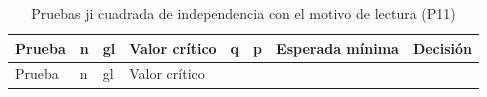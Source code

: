 \documentclass[
  spanish,
  11pt,
]{extarticle}
\begin{document}
\begin{longtable}[]{@{}
  >{\raggedright\arraybackslash}p{}
  >{\raggedleft\arraybackslash}p{}
  >{\raggedleft\arraybackslash}p{}
  >{\raggedleft\arraybackslash}p{}
  >{\raggedleft\arraybackslash}p{}
  >{\raggedright\arraybackslash}p{}
  >{\raggedleft\arraybackslash}p{}
  >{\raggedright\arraybackslash}p{}@{}}
\caption{Pruebas ji cuadrada de independencia con el motivo de lectura
(P11)}\tabularnewline
\toprule\noalign{}
\begin{minipage}[b]{\linewidth}\raggedright
Prueba
\end{minipage} & \begin{minipage}[b]{\linewidth}\raggedleft
n
\end{minipage} & \begin{minipage}[b]{\linewidth}\raggedleft
gl
\end{minipage} & \begin{minipage}[b]{\linewidth}\raggedleft
Valor crítico
\end{minipage} & \begin{minipage}[b]{\linewidth}\raggedleft
q
\end{minipage} & \begin{minipage}[b]{\linewidth}\raggedright
p
\end{minipage} & \begin{minipage}[b]{\linewidth}\raggedleft
Esperada mínima
\end{minipage} & \begin{minipage}[b]{\linewidth}\raggedright
Decisión
\end{minipage} \\
\midrule\noalign{}
\endfirsthead
\toprule\noalign{}
\begin{minipage}[b]{\linewidth}\raggedright
Prueba
\end{minipage} & \begin{minipage}[b]{\linewidth}\raggedleft
n
\end{minipage} & \begin{minipage}[b]{\linewidth}\raggedleft
gl
\end{minipage} & \begin{minipage}[b]{\linewidth}\raggedleft
Valor crítico

\end{minipage}
\end{longtable}
\end{document}
